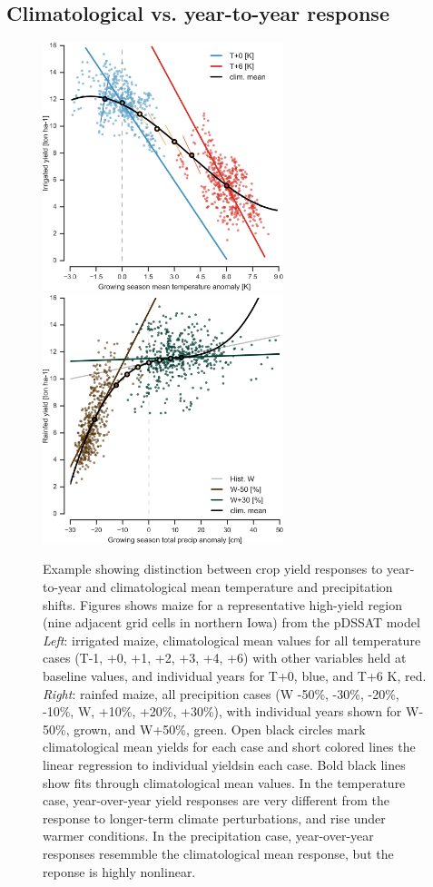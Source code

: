 \documentclass[gmd, manuscript]{copernicus} %
\begin{document}
\subsection{Climatological vs. year-to-year response}
\begin{figure}[ht]
\centering
   \includegraphics[width=7cm]{figures/tempyearvclim.png} \hspace{10mm} \includegraphics[width=7cm]{figures/pryearvclim.png}
   \caption{
   Example showing distinction between crop yield responses to year-to-year and climatological mean temperature and precipitation shifts. Figures shows
	maize for a representative high-yield region (nine adjacent grid cells in northern Iowa) from the pDSSAT model \textit{Left}: irrigated maize, climatological mean values for all temperature cases (T-1, +0, +1, +2, +3, +4, +6) with other variables held at baseline values, and individual years for T+0, blue, and T+6 K, red. \textit{Right}: rainfed maize, all precipition cases (W -50\%, -30\%, -20\%, -10\%, W, +10\%, +20\%, +30\%), with individual years shown for W-50\%, grown, and W+50\%, green.
	Open black circles mark climatological mean yields for each case and short colored lines the linear regression to individual yieldsin each case.  Bold black lines show  fits through climatological mean values. 
   In the temperature case, year-over-year yield responses are very different from the response to longer-term climate perturbations, and rise under warmer conditions. In the precipitation case, year-over-year responses resemmble the climatological mean response, but the reponse is highly nonlinear.}
   \label{fig:yearvclim}
\end{figure}
\end{document}
